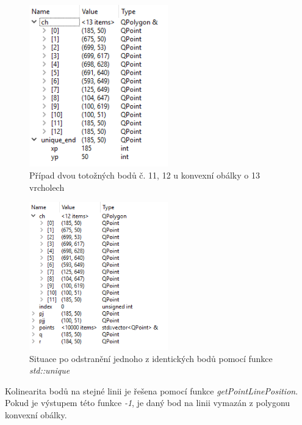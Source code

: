 \documentclass[a4paper,11pt,twoside]{article}
\begin{document}
\vspace{0.2cm}
\begin{figure}[hbt!] 
\begin{center}
\includegraphics[width=6cm]{pictures/totozne.png} 
\caption[Případ dvou totožných bodů č. 11, 12 u konvexní obálky o 13 vrcholech]{Případ dvou totožných bodů č. 11, 12 u konvexní obálky o 13 vrcholech}
\label{fig:tot}
\end{center}
\end{figure}
\vspace{-0.4cm}

\begin{figure}[hbt!] 
\begin{center}
\includegraphics[width=6cm]{pictures/po_odstraneni.png} 
\caption[Situace po odstranění jednoho z identických bodů pomocí funkce \textit{std::unique}]{Situace po odstranění jednoho z identických bodů pomocí funkce \textit{std::unique}}
\label{fig:po_odstraneni}
\end{center}
\end{figure}
\vspace{-0.4cm}

Kolinearita bodů na stejné linii je řešena pomocí funkce \textit{getPointLinePosition}. Pokud je výstupem této funkce \textit{-1}, je daný bod na linii vymazán z polygonu konvexní obálky.
\end{document}

